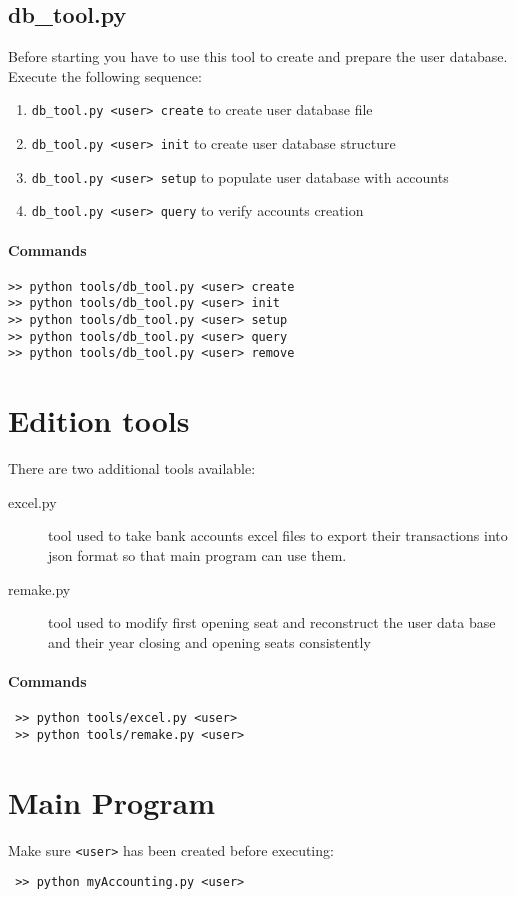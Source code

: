 \documentclass[12pt, a4paper]{article}
\begin{document}
 \subsection{db\_tool.py}
 Before starting you have to use this tool to create and prepare the user database. 
 Execute the following sequence:
 \begin{enumerate}[wide, labelwidth=!, labelindent=0pt]
 \item \verb!db_tool.py <user> create! to create user database file
 \item \verb!db_tool.py <user> init! to create user database structure		
 \item \verb!db_tool.py <user> setup!	 to populate user database with accounts
 \item \verb!db_tool.py <user> query! to verify accounts creation
\end{enumerate}
\paragraph{Commands}
\begin{verbatim}
>> python tools/db_tool.py <user> create
>> python tools/db_tool.py <user> init
>> python tools/db_tool.py <user> setup
>> python tools/db_tool.py <user> query
>> python tools/db_tool.py <user> remove
\end{verbatim}
 \section{Edition tools}
 There are two additional tools available: 
 \begin{description}
 \item[excel.py] tool used to take bank accounts excel files to export their transactions into json format so that main program can use them. 
 \item[remake.py] tool used to modify first opening seat and reconstruct the user data base and their year closing and opening seats consistently 
 \end{description}
 \paragraph{Commands}
 \begin{verbatim}
 >> python tools/excel.py <user>
 >> python tools/remake.py <user>
 \end{verbatim}
  
  \section{Main Program}
 Make sure \verb!<user>! has been created before 
 executing:
 \begin{verbatim}
 >> python myAccounting.py <user>
 \end{verbatim}

   
\end{document}
